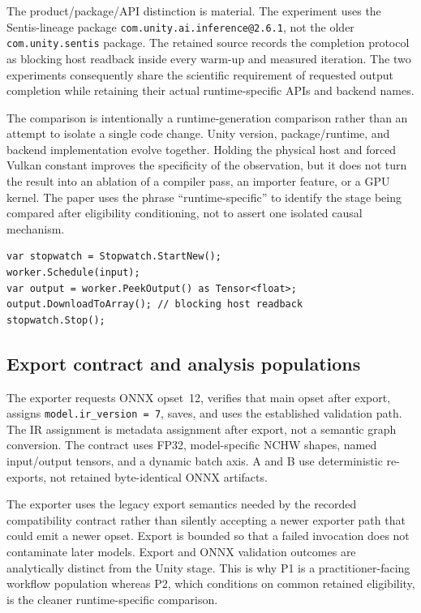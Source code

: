 The product/package/API distinction is material. The experiment uses the Sentis-lineage package \texttt{com.unity.ai.inference@2.6.1}, not the older \texttt{com.unity.sentis} package. The retained source records the completion protocol as blocking host readback inside every warm-up and measured iteration. The two experiments consequently share the scientific requirement of requested output completion while retaining their actual runtime-specific APIs and backend names.

The comparison is intentionally a runtime-generation comparison rather than an attempt to isolate a single code change. Unity version, package/runtime, and backend implementation evolve together. Holding the physical host and forced Vulkan constant improves the specificity of the observation, but it does not turn the result into an ablation of a compiler pass, an importer feature, or a GPU kernel. The paper uses the phrase ``runtime-specific'' to identify the stage being compared after eligibility conditioning, not to assert one isolated causal mechanism.

\begin{lstlisting}[language={[Sharp]C},caption={Condensed Experiment \B completion boundary. The helper is called during warm-ups and timed iterations.},label={lst:sentis-boundary}]
var stopwatch = Stopwatch.StartNew();
worker.Schedule(input);
var output = worker.PeekOutput() as Tensor<float>;
output.DownloadToArray(); // blocking host readback
stopwatch.Stop();
\end{lstlisting}

\subsection{Export contract and analysis populations}
The exporter requests ONNX opset~12, verifies that main opset after export, assigns \texttt{model.ir\_version = 7}, saves, and uses the established validation path. The IR assignment is metadata assignment after export, not a semantic graph conversion. The contract uses FP32, model-specific NCHW shapes, named input/output tensors, and a dynamic batch axis. A and B use deterministic re-exports, not retained byte-identical ONNX artifacts.

The exporter uses the legacy export semantics needed by the recorded compatibility contract rather than silently accepting a newer exporter path that could emit a newer opset. Export is bounded so that a failed invocation does not contaminate later models. Export and ONNX validation outcomes are analytically distinct from the Unity stage. This is why P1 is a practitioner-facing workflow population whereas P2, which conditions on common retained eligibility, is the cleaner runtime-specific comparison.

